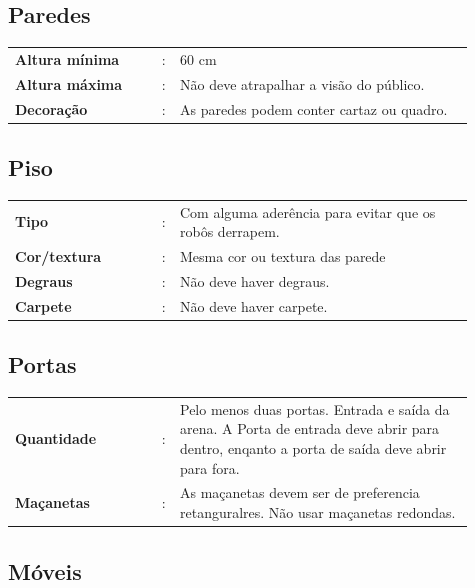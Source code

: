 \documentclass[11pt, twoside, openright, a4paper, chapterprefix]{article}
\begin{document}
\subsection{Paredes}

\begin{tabular}{ p{0.3\linewidth} p{0.01\linewidth} p{0.6\linewidth}}
    \textbf{Altura mínima}           & : & 60 cm \\
    \textbf{Altura máxima}           & : & Não deve atrapalhar a visão do público. \\
    \textbf{Decoração}                   & : & As paredes podem conter cartaz ou quadro. 
\end{tabular}

\subsection{Piso}

\begin{tabular}{ p{0.3\linewidth} p{0.01\linewidth} p{0.6\linewidth}}
    \textbf{Tipo}                     & : & Com alguma aderência para evitar que os robôs derrapem. \\
    \textbf{Cor/textura}     & : & Mesma cor ou textura das parede \\
    \textbf{Degraus}              & : & Não deve haver degraus. \\
    \textbf{Carpete}              & : & Não deve haver carpete. 
\end{tabular}

\subsection{Portas}

\begin{tabular}{ p{0.3\linewidth} p{0.01\linewidth} p{0.6\linewidth}}
    \textbf{Quantidade}   & : & Pelo menos duas portas. Entrada e saída da arena. A Porta de entrada deve abrir para dentro, enqanto a porta de saída deve abrir para fora. \\
    \textbf{Maçanetas}     & : & As maçanetas devem ser de preferencia retanguralres. Não usar maçanetas redondas. \\
\end{tabular}

\subsection{Móveis}
\end{document}
